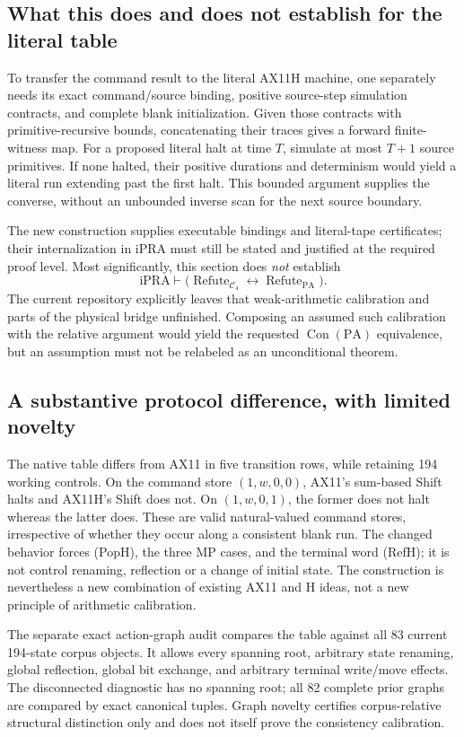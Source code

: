 \subsection{What this does and does not establish for the literal table}

To transfer the command result to the literal AX11H machine, one separately
needs its exact command/source binding, positive source-step simulation
contracts, and complete blank initialization.  Given those contracts with
primitive-recursive bounds, concatenating their traces gives a forward
finite-witness map.  For a proposed literal halt at time $T$, simulate at
most $T+1$ source primitives.  If none halted, their positive durations and
determinism would yield a literal run extending past the first halt.  This
bounded argument supplies the converse, without an unbounded inverse scan
for the next source boundary.

The new construction supplies executable bindings and literal-tape
certificates; their internalization in iPRA must still be stated and
justified at the required proof level.  Most significantly, this section
does \emph{not} establish
\[
 \mathrm{iPRA}\vdash
 \bigl(\operatorname{Refute}_{\mathcal C_4}
               \leftrightarrow\operatorname{Refute}_{\mathrm{PA}}\bigr).
\]
The current repository explicitly leaves that weak-arithmetic calibration
and parts of the physical bridge unfinished.  Composing an assumed such
calibration with the relative argument would yield the requested
$\operatorname{Con}(\mathrm{PA})$ equivalence, but an assumption must not
be relabeled as an unconditional theorem.

\subsection{A substantive protocol difference, with limited novelty}

The native table differs from AX11 in five transition rows, while retaining
194 working controls.  On the command store $(1,w,0,0)$, AX11's sum-based
Shift halts and AX11H's Shift does not.  On $(1,w,0,1)$, the former does
not halt whereas the latter does.  These are valid natural-valued command
stores, irrespective of whether they occur along a consistent blank run.
The changed behavior forces (PopH), the three MP cases, and the terminal
word (RefH); it is not control renaming, reflection or a change of initial
state.  The construction is nevertheless a new combination of existing
AX11 and H ideas, not a new principle of arithmetic calibration.

The separate exact action-graph audit compares the table against all 83
current 194-state corpus objects.  It allows every spanning root, arbitrary
state renaming, global reflection, global bit exchange, and arbitrary
terminal write/move effects.  The disconnected diagnostic has no spanning
root; all 82 complete prior graphs are compared by exact canonical tuples.
Graph novelty certifies corpus-relative structural distinction only and
does not itself prove the consistency calibration.
